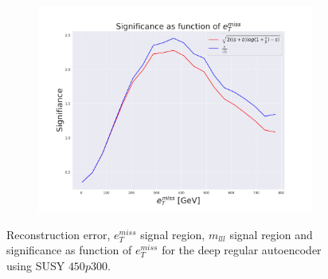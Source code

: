 \begin{figure}[H]
    \hfill  
    \begin{subfigure}{.60\textwidth}
        \includegraphics[width=\textwidth]{Figures/AE_testing/small/2lep/significance_etmiss_450p0p0300_-1.7167506533614734.pdf}
        \caption{}
        \label{fig:AE_2lep_small_signi_450}
    \end{subfigure}
    \hfill      
    \caption[2lep shallow network | $450p300$ | AE]{Reconstruction error, $e_T^{miss}$ signal region, $m_{lll}$ signal region and significance as function of 
    $e_T^{miss}$ for the deep regular autoencoder using SUSY $450p300$.}
    \label{fig:AE_2lep_small_rec_sig_signi_450}
\end{figure}


